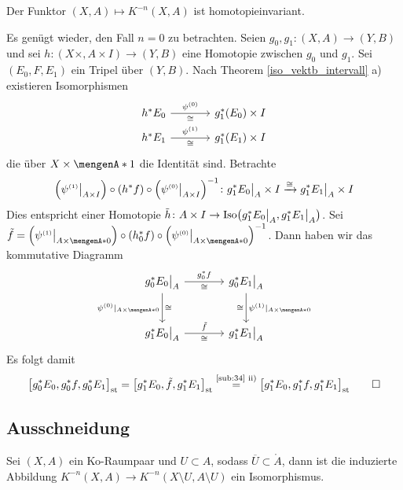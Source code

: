 \begin{lemma}[label=sub:36]
Der Funktor $(X,A) \mapsto K^{-n}(X,A)$ ist homotopieinvariant.
\end{lemma}
\begin{beweis}
Es genügt wieder, den Fall $n=0$ zu betrachten. Seien $g_0,g_1 \colon (X,A) \to (Y,B)$ und sei $h \colon (X \times,A \times I) \to (Y,B)$ eine Homotopie zwischen $g_0$ und 
$g_1$. Sei $(E_0,F,E_1)$ ein Tripel über $(Y,B)$. Nach Theorem \ref{iso_vektb_intervall} a) existieren Isomorphismen
\[
	\begin{tikzcd}[column sep=large, row sep=0.5em]
		h^* E_0 \rar["\psi^\ssbrace{0}","\cong"'] & g_1^*(E_0) \times I \\
		h^* E_1 \rar["\psi^\ssbrace{1}","\cong"'] & g_1^*(E_1) \times I
	\end{tikzcd}
\]
die über $X \times \set{1}$ die Identität sind. Betrachte 
\[
	\enbrace*{\psi^\ssbrace{1}\big|_{A \times I}} \circ \enbrace*{h^* f} \circ \enbrace*{\psi^\ssbrace{0}\big|_{A \times I}} ^{-1} \colon g^*_1 E_0\big|_A \times I  
	\xrightarrow{\cong} g_1^*E_1\big|_A \times I   
\]
Dies entspricht einer Homotopie $\tilde{h} \colon A \times I \to \Iso \enbrace*{g_1^*E_0\big|_A, g_1^* E_1\big|_A}$. Sei $\tilde{f} = \enbrace*{\psi^\ssbrace{1}\big|_{A \times \set{0}}} \circ \enbrace*{h^*_0 f} \circ \enbrace*{\psi^\ssbrace{0}\big|_{A \times \set{0}}} ^{-1} $. Dann haben wir das kommutative Diagramm
\[
	\begin{tikzcd}[sep=large]
		g_0^* E_0\big|_A \rar["g_0^*f","\cong"'] \dar["\psi^\ssbrace{0}|_{A \times \set{0}}"',"\cong"] & g_0^*E_1\big|_A \dar["\psi^\ssbrace{1}|_{A \times \set{0} }","\cong"'] \\
		g^*_1 E_0\big|_A \rar["\cong"',"\tilde{f}"] & g_1^* E_1\big|_A
	\end{tikzcd}
\]
Es folgt damit
\begin{align*}
	\benbrace[\big]{g_0^* E_0, g^*_0 f , g^*_0 E_1}_\st = \benbrace*{g_1^* E_0, \tilde{f}, g_1^* E_1}_\st \stackrel{\mbox{\scriptsize \ref{sub:34} ii)}}{=}
	\benbrace[\big]{g_1^* E_0, g_1^* f, g_1^* E_1}_\st \qedhere
\end{align*}	
\end{beweis}

\subsection*{Ausschneidung}
Sei $(X,A)$ ein Ko-Raumpaar und $U \subset A$, sodass $\overline{U} \subset \mathring{A}$, dann ist die induzierte Abbildung 
$K^{-n}(X,A) \to K^{-n}(X \setminus U, A \setminus U)$ ein Isomorphismus.

